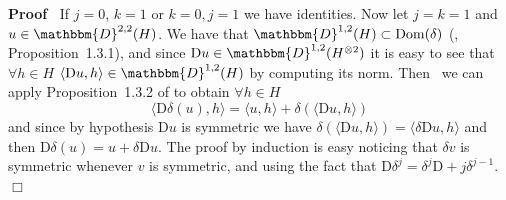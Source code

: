 \documentclass[a4paper,11pt]{article}
\newcommand{\mathD}{\mathrm{D}}
\newcommand{\tmop}[1]{\ensuremath{\operatorname{#1}}}
\newenvironment{proof}{\noindent\textbf{Proof\ }}{\hspace*{\fill}$\Box$\medskip}
\begin{document}
\begin{proof}
  If $j = 0$, $k = 1$ or $k = 0, j = 1$ we have identities. Now let $j = k =
  1$ and $u \in \mathbbm{D}^{2, 2} (H)$. We have that $\mathbbm{D}^{1, 2} (H)
  \subset \tmop{Dom} (\delta)$ ({\cite{nualart_2006}}, Proposition~1.3.1), and
  since $\mathD u \in \mathbbm{D}^{1, 2} (H^{\otimes 2})$ it is easy to see
  that $\forall h \in H$ $\langle \mathD u, h \rangle \in \mathbbm{D}^{1, 2}
  (H)$ by computing its norm. Then \ we can apply Proposition~1.3.2 of
  {\cite{nualart_2006}} to obtain $\forall h \in H$
  \[ \langle \mathD \delta (u), h \rangle = \langle u, h \rangle + \delta
     (\langle \mathD u, h \rangle) \]
  and since by hypothesis $\mathD u$ is symmetric we have $\delta (\langle
  \mathD u, h \rangle) = \langle \delta \mathD u, h \rangle$ and then $\mathD
  \delta (u) = u + \delta \mathD u$. The proof by induction is easy noticing
  that $\delta v$ is symmetric whenever $v$ is symmetric, and using the fact
  that $\mathD \delta^j = \delta^j \mathD + j \delta^{j - 1}$.
\end{proof}
\end{document}
